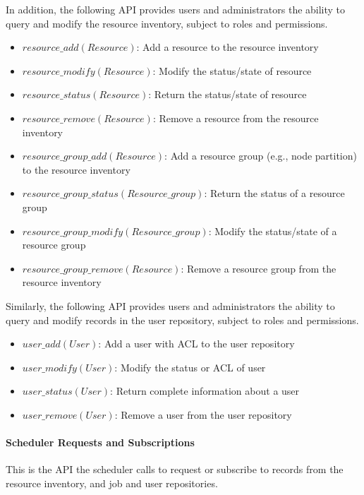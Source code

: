 In addition, the following API provides users and administrators the
ability to query and modify the resource inventory, subject to roles
and permissions.

\begin{itemize}
\item{$resource\_add(Resource)$: Add a resource to the resource inventory}
\item{$resource\_modify(Resource)$: Modify the status/state of resource}
\item{$resource\_status(Resource)$: Return the status/state of resource}
\item{$resource\_remove(Resource)$: Remove a resource from the resource inventory}
\item{$resource\_group\_add(Resource)$: Add a resource group (e.g., node partition) to the resource inventory}
\item{$resource\_group\_status(Resource\_group)$: Return the status of a resource group}
\item{$resource\_group\_modify(Resource\_group)$: Modify the status/state of a resource group}
\item{$resource\_group\_remove(Resource)$: Remove a resource group from the resource inventory}
\end{itemize}

Similarly, the following API provides users and administrators the
ability to query and modify records in the user repository, subject to
roles and permissions.

\begin{itemize}
\item{$user\_add(User)$: Add a user with ACL to the user repository}
\item{$user\_modify(User)$: Modify the status or ACL of user}
\item{$user\_status(User)$: Return complete information about a user}
\item{$user\_remove(User)$: Remove a user from the user repository}
\end{itemize}

\paragraph{Scheduler Requests and Subscriptions}
This is the API the scheduler calls to request or subscribe to records
from the resource inventory, and job and user repositories.

